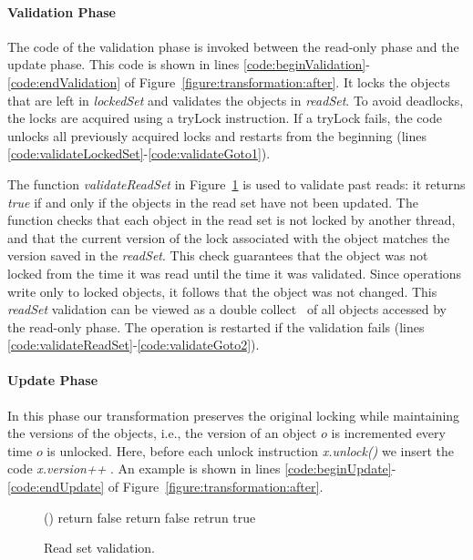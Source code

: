 \paragraph{Validation Phase}
The code of the validation phase is invoked between the read-only phase and the update phase.
This code is shown in lines \ref{code:beginValidation}-\ref{code:endValidation} of Figure~\ref{figure:transformation:after}.
It locks the objects that are left in \emph{lockedSet} and validates the objects in \emph{readSet}.
To avoid deadlocks, the locks are acquired using a tryLock
instruction.
If a tryLock fails, the code unlocks  all
previously acquired locks and restarts from the beginning
(lines \ref{code:validateLockedSet}-\ref{code:validateGoto1}).

The function \emph{validateReadSet} in Figure~\ref{figure::validate} is used to validate past reads: it returns \emph{true} if and only if the objects in the read set have not been updated.
%
The function checks that each object in the read set is not locked by another thread,
and that the current version of the lock associated with the object matches the version saved in the
\emph{readSet}.
This check guarantees that the object was not locked from the time it was read until
the time it was validated.
Since operations write only to
locked objects, it follows that the object was not changed.
This \emph{readSet} validation can be viewed as a double collect~\cite{Afek:1993:ASS:153724.153741}
of all objects accessed by the read-only phase.
%
The operation is restarted if the validation fails (lines \ref{code:validateReadSet}-\ref{code:validateGoto2}).

\paragraph{Update Phase}
In this phase our transformation preserves the original locking while maintaining the versions of the objects, i.e., the version of an object $o$ is incremented every time $o$ is unlocked.
Here, before each unlock instruction \emph{\ttfamily x.unlock()} we insert the code \emph{\ttfamily x.version++} .
An example is shown in lines \ref{code:beginUpdate}-\ref{code:endUpdate} of Figure~\ref{figure:transformation:after}.

\begin{figure}
\codesize
\begin{algorithmic}[1]{}
		{\ttfamily
		()
			\State return false  \label{code:validate:verifyUnlocked}
			\State {}
			\EndIf
				\State return false  \label{code:validate:verifyVersion}
				\State {}
			\EndIf
		\EndFor
		\State retrun true 
		\EndFunction
		}
\end{algorithmic}
\caption{Read set validation.\label{figure::validate}}
\end{figure}



